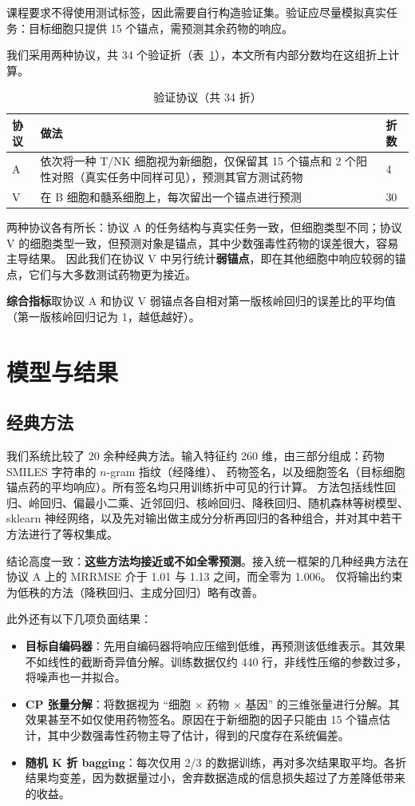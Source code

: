 \documentclass[11pt,a4paper]{article}
\begin{document}
课程要求不得使用测试标签，因此需要自行构造验证集。验证应尽量模拟真实任务：目标细胞只提供 15 个锚点，需预测其余药物的响应。

我们采用两种协议，共 34 个验证折（表~\ref{tab:protocols}），本文所有内部分数均在这组折上计算。

\begin{table}[H]
\centering\small
\caption{验证协议（共 34 折）}\label{tab:protocols}
\begin{tabular}{@{}lp{}l@{}}
\toprule
协议 & 做法 & 折数 \\
\midrule
A & 依次将一种 T/NK 细胞视为新细胞，仅保留其 15 个锚点和 2 个阳性对照（真实任务中同样可见），预测其官方测试药物 & 4 \\
V & 在 B 细胞和髓系细胞上，每次留出一个锚点进行预测 & 30 \\
\bottomrule
\end{tabular}
\end{table}

两种协议各有所长：协议 A 的任务结构与真实任务一致，但细胞类型不同；协议 V 的细胞类型一致，但预测对象是锚点，其中少数强毒性药物的误差很大，容易主导结果。
因此我们在协议 V 中另行统计\textbf{弱锚点}，即在其他细胞中响应较弱的锚点，它们与大多数测试药物更为接近。

\textbf{综合指标}取协议 A 和协议 V 弱锚点各自相对第一版核岭回归的误差比的平均值（第一版核岭回归记为 1，越低越好）。

\section{模型与结果}

\subsection{经典方法}
我们系统比较了 20 余种经典方法。输入特征约 260 维，由三部分组成：药物 SMILES 字符串的 $n$-gram 指纹（经降维）、
药物签名，以及细胞签名（目标细胞锚点药的平均响应）。所有签名均只用训练折中可见的行计算。
方法包括线性回归、岭回归、偏最小二乘、近邻回归、核岭回归、降秩回归、随机森林等树模型、sklearn 神经网络，以及先对输出做主成分分析再回归的各种组合，并对其中若干方法进行了等权集成。

结论高度一致：\textbf{这些方法均接近或不如全零预测}。接入统一框架的几种经典方法在协议 A 上的 MRRMSE 介于 1.01 与 1.13 之间，而全零为 1.006。
仅将输出约束为低秩的方法（降秩回归、主成分回归）略有改善。

此外还有以下几项负面结果：
\begin{itemize}
\item \textbf{目标自编码器}：先用自编码器将响应压缩到低维，再预测该低维表示。其效果不如线性的截断奇异值分解。训练数据仅约 440 行，非线性压缩的参数过多，将噪声也一并拟合。
\item \textbf{CP 张量分解}：将数据视为 ``细胞 $\times$ 药物 $\times$ 基因'' 的三维张量进行分解。其效果甚至不如仅使用药物签名。原因在于新细胞的因子只能由 15 个锚点估计，其中少数强毒性药物主导了估计，得到的尺度存在系统偏差。
\item \textbf{随机 K 折 bagging}：每次仅用 2/3 的数据训练，再对多次结果取平均。各折结果均变差，因为数据量过小，舍弃数据造成的信息损失超过了方差降低带来的收益。
\end{itemize}
\end{document}
